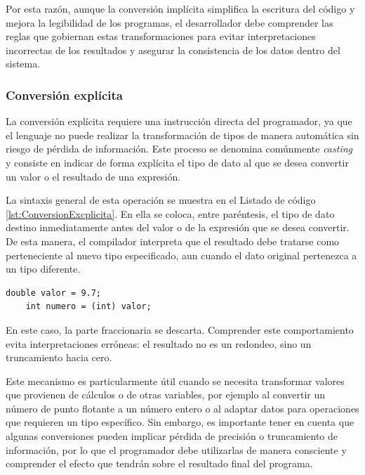 \documentclass[12pt,twoside]{book}
\begin{document}
						Por esta razón, aunque la conversión implícita simplifica la escritura del código y mejora la legibilidad de los programas, el desarrollador debe comprender las reglas que gobiernan estas transformaciones para evitar interpretaciones incorrectas de los resultados y asegurar la consistencia de los datos dentro del sistema.						
					\subsubsection{Conversión explícita}
						\noindent
						La conversión explícita requiere una instrucción directa del programador, ya que el lenguaje no puede realizar la transformación de tipos de manera automática sin riesgo de pérdida de información. Este proceso se denomina comúnmente \textit{casting} y consiste en indicar de forma explícita el tipo de dato al que se desea convertir un valor o el resultado de una expresión. 
						
						La sintaxis general de esta operación se muestra en el Listado de código \ref{lst:ConversionExcplicita}. En ella se coloca, entre paréntesis, el tipo de dato destino inmediatamente antes del valor o de la expresión que se desea convertir. De esta manera, el compilador interpreta que el resultado debe tratarse como perteneciente al nuevo tipo especificado, aun cuando el dato original pertenezca a un tipo diferente.
						
						\begin{lstlisting}[style=Java,caption={Conversión Explícita de Datos.},label={lst:ConversionExcplicita}]
	double valor = 9.7;
	int numero = (int) valor; \end{lstlisting}
						
						\noindent
						En este caso, la parte fraccionaria se descarta. Comprender este comportamiento evita interpretaciones erróneas: el resultado no es un redondeo, sino un truncamiento hacia cero.
						
						Este mecanismo es particularmente útil cuando se necesita transformar valores que provienen de cálculos o de otras variables, por ejemplo al convertir un número de punto flotante a un número entero o al adaptar datos para operaciones que requieren un tipo específico. Sin embargo, es importante tener en cuenta que algunas conversiones pueden implicar pérdida de precisión o truncamiento de información, por lo que el programador debe utilizarlas de manera consciente y comprender el efecto que tendrán sobre el resultado final del programa.
\end{document}
